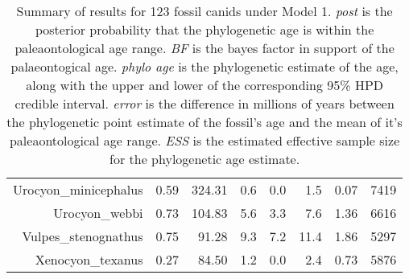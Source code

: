 \begin{table}[ht]
\begin{tabular}{rrrrrrrr}
  Urocyon\_minicephalus & 0.59 & 324.31 & 0.6 & 0.0 & 1.5 & 0.07 & 7419 \\ 
  Urocyon\_webbi & 0.73 & 104.83 & 5.6 & 3.3 & 7.6 & 1.36 & 6616 \\ 
  Vulpes\_stenognathus & 0.75 & 91.28 & 9.3 & 7.2 & 11.4 & 1.86 & 5297 \\ 
  Xenocyon\_texanus & 0.27 & 84.50 & 1.2 & 0.0 & 2.4 & 0.73 & 5876 \\ 
   \hline
\end{tabular}
\caption{Summary of results for 123 fossil canids under Model 1. {\em post} is the posterior probability that the phylogenetic age is within the paleaontological age range. {\em BF} is the bayes factor in support of the palaeontogical age. {\em phylo age} is the phylogenetic estimate of the age, along with the upper and lower of the corresponding 95\% HPD credible interval. {\em error} is the difference in millions of years between the phylogenetic point estimate of the fossil's age and the mean of it's paleaontological age range. {\em ESS} is the estimated effective sample size for the phylogenetic age estimate.} 
\label{fossilTable_c}
\end{table}
